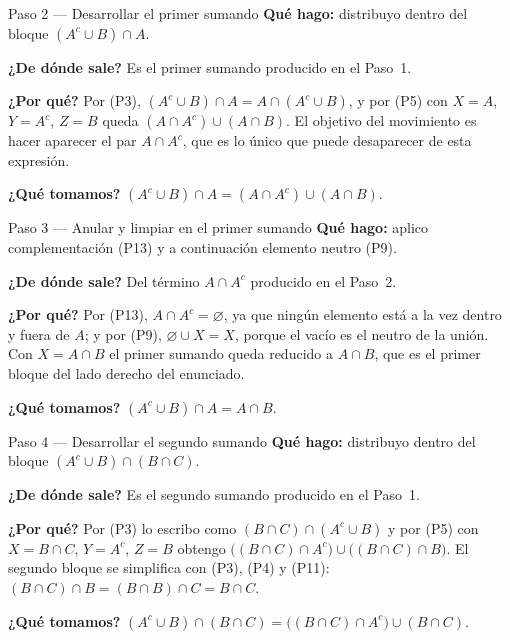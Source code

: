 \documentclass[11pt]{article}
\begin{document}
\begin{paso}{Paso 2 --- Desarrollar el primer sumando}
\textbf{Qué hago:} distribuyo dentro del bloque $(A^{c}\cup B)\cap A$.

\textbf{¿De dónde sale?} Es el primer sumando producido en el Paso~1.

\textbf{¿Por qué?} Por (P3), $(A^{c}\cup B)\cap A=A\cap(A^{c}\cup B)$, y por (P5) con $X=A$,
$Y=A^{c}$, $Z=B$ queda $(A\cap A^{c})\cup(A\cap B)$. El objetivo del movimiento es hacer
aparecer el par $A\cap A^{c}$, que es lo único que puede desaparecer de esta expresión.

\textbf{¿Qué tomamos?} $(A^{c}\cup B)\cap A=(A\cap A^{c})\cup(A\cap B)$.
\end{paso}

\begin{paso}{Paso 3 --- Anular y limpiar en el primer sumando}
\textbf{Qué hago:} aplico complementación (P13) y a continuación elemento neutro (P9).

\textbf{¿De dónde sale?} Del término $A\cap A^{c}$ producido en el Paso~2.

\textbf{¿Por qué?} Por (P13), $A\cap A^{c}=\varnothing$, ya que ningún elemento está a la vez
dentro y fuera de $A$; y por (P9), $\varnothing\cup X=X$, porque el vacío es el neutro de la
unión. Con $X=A\cap B$ el primer sumando queda reducido a $A\cap B$, que es el primer bloque del
lado derecho del enunciado.

\textbf{¿Qué tomamos?} $(A^{c}\cup B)\cap A=A\cap B$.
\end{paso}

\begin{paso}{Paso 4 --- Desarrollar el segundo sumando}
\textbf{Qué hago:} distribuyo dentro del bloque $(A^{c}\cup B)\cap(B\cap C)$.

\textbf{¿De dónde sale?} Es el segundo sumando producido en el Paso~1.

\textbf{¿Por qué?} Por (P3) lo escribo como $(B\cap C)\cap(A^{c}\cup B)$ y por (P5) con
$X=B\cap C$, $Y=A^{c}$, $Z=B$ obtengo
$\bigl((B\cap C)\cap A^{c}\bigr)\cup\bigl((B\cap C)\cap B\bigr)$. El segundo bloque se simplifica
con (P3), (P4) y (P11): $(B\cap C)\cap B=(B\cap B)\cap C=B\cap C$.

\textbf{¿Qué tomamos?}
$(A^{c}\cup B)\cap(B\cap C)=\bigl((B\cap C)\cap A^{c}\bigr)\cup(B\cap C)$.
\end{paso}
\end{document}
